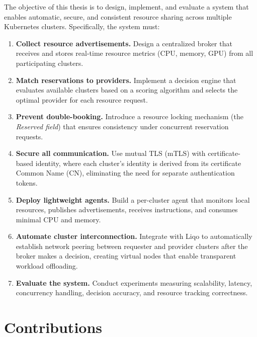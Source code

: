 The objective of this thesis is to design, implement, and evaluate a system that enables automatic, secure, and consistent resource sharing across multiple Kubernetes clusters. Specifically, the system must:

\begin{enumerate}
    \item \textbf{Collect resource advertisements.} Design a centralized broker that receives and stores real-time resource metrics (CPU, memory, GPU) from all participating clusters.

    \item \textbf{Match reservations to providers.} Implement a decision engine that evaluates available clusters based on a scoring algorithm and selects the optimal provider for each resource request.

    \item \textbf{Prevent double-booking.} Introduce a resource locking mechanism (the \textit{Reserved field}) that ensures consistency under concurrent reservation requests.

    \item \textbf{Secure all communication.} Use mutual TLS (mTLS) with certificate-based identity, where each cluster's identity is derived from its certificate Common Name (CN), eliminating the need for separate authentication tokens.

    \item \textbf{Deploy lightweight agents.} Build a per-cluster agent that monitors local resources, publishes advertisements, receives instructions, and consumes minimal CPU and memory.

    \item \textbf{Automate cluster interconnection.} Integrate with Liqo to automatically establish network peering between requester and provider clusters after the broker makes a decision, creating virtual nodes that enable transparent workload offloading.

    \item \textbf{Evaluate the system.} Conduct experiments measuring scalability, latency, concurrency handling, decision accuracy, and resource tracking correctness.
\end{enumerate}


\section{Contributions}
\label{sec:contributions}

